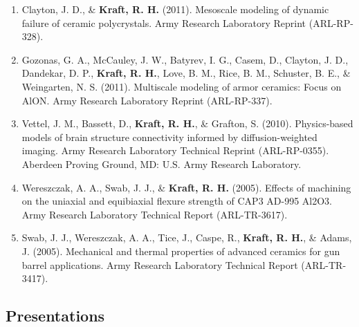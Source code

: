 \documentclass[a4paper,10pt]{article}
\begin{document}
\begin{enumerate}
  \item Clayton, J. D., \&
 \textbf{\textbf{Kraft,} R. H.} (2011). Mesoscale modeling of dynamic failure of ceramic polycrystals. Army Research Laboratory Reprint (ARL-RP-328).
  \item Gozonas, G. A., McCauley, J. W., Batyrev, I. G., Casem, D., Clayton, J. D., Dandekar, D. P., \textbf{\textbf{Kraft,} R. H.}, Love, B. M., Rice, B. M., Schuster, B. E., \&
 Weingarten, N. S. (2011). Multiscale modeling of armor ceramics: Focus on AlON. Army Research Laboratory Reprint (ARL-RP-337).
  \item Vettel, J. M., Bassett, D., \textbf{\textbf{Kraft,} R. H.}, \&
 Grafton, S. (2010). Physics-based models of brain structure connectivity informed by diffusion-weighted imaging. Army Research Laboratory Technical Reprint (ARL-RP-0355). Aberdeen Proving Ground, MD: U.S. Army Research Laboratory.
  \item Wereszczak, A. A., Swab, J. J., \&
 \textbf{\textbf{Kraft,} R. H.} (2005). Effects of machining on the uniaxial and equibiaxial flexure strength of CAP3 AD-995 Al2O3. Army Research Laboratory Technical Report (ARL-TR-3617).
  \item Swab, J. J., Wereszczak, A. A., Tice, J., Caspe, R., \textbf{\textbf{Kraft,} R. H.}, \&
 Adams, J. (2005). Mechanical and thermal properties of advanced ceramics for gun barrel applications. Army Research Laboratory Technical Report (ARL-TR-3417).

\end{enumerate}\vspace{1\baselineskip}

\subsection{Presentations}\label{presentations}
\end{document}
